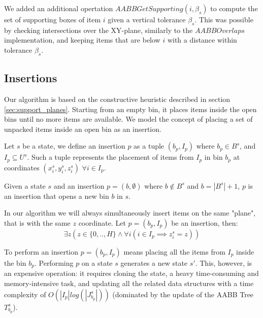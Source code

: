 \label{aabb:get_supporting}%
We added an additional opertation $AABBGetSupporting(i, \beta_s)$ to compute the set of supporting boxes of item $i$ given a vertical tolerance $\beta_s$.
This was possible by checking intersections over the XY-plane, similarly to the $AABBOverlaps$ implementation, and keeping items that are below $i$ with a distance within tolerance $\beta_s$.

\subsection{Insertions}
\label{sec:problem_state:insertions}%

Our algorithm is based on the constructive heuristic described in section \ref{sec:support_planes}. Starting from an empty bin, it places items inside the open bins until no more items are available. We model the concept of placing a set of unpacked items inside an open bin as an insertion.
\begin{definition}[Insertion]
    \label{def:insertion}%
    Let $s$ be a state, we define an insertion $p$ as a tuple $(b_p, I_p)$ where $b_p \in B^s$, and $I_p \subseteq U^s$. Such a tuple represents the placement of items from $I_p$ in bin $b_p$ at coordinates $(x^s_i, y^s_i, z^s_i)$ $\forall i \in I_p$.
\end{definition}
\begin{observation}
    \label{oss:state_bin_open}
    Given a state $s$ and an insertion $p = (b, \emptyset)$ where $b \notin B^s$ and $b = |B^s| + 1$, $p$ is an insertion that opens a new bin $b$ in $s$.
\end{observation}
\begin{observation}
    \label{obs:same_z_insertion}
    In our algorithm we will always simultaneously insert items on the same "plane", that is with the same $z$ coordinate. Let $p = (b_p, I_p)$ be an insertion, then:
    \begin{equation}
        \exists z (z \in \{0,..,H\} \land \forall i ( i \in I_p \implies z^s_i = z))
    \end{equation}
\end{observation}
To perform an insertion $p = (b_p, I_p)$ means placing all the items from $I_p$ inside the bin $b_p$. Performing $p$ on a state $s$ generates a new state $s'$. This, however, is an expensive operation: it requires cloning the state, a heavy time-consuming and memory-intensive task, and updating all the related data structures with a time complexity of $O(|I_p|log(|J^s_{b_p}|))$ (dominated by the update of the AABB Tree $T^s_{b_p}$). 

